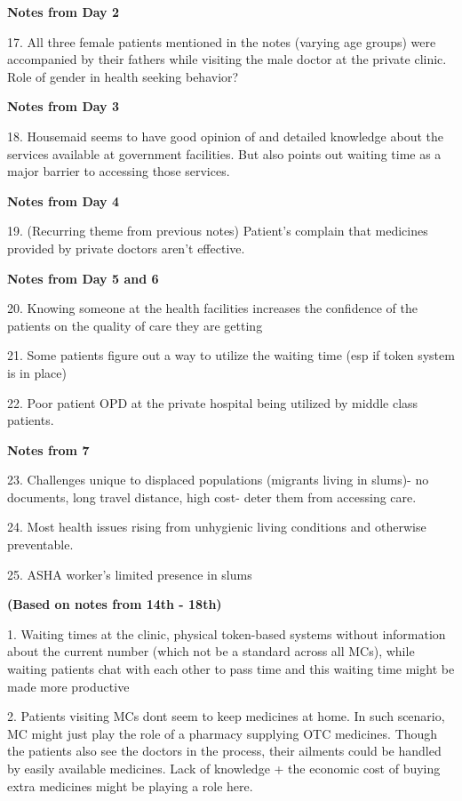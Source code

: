 \textbf{Notes from Day 2}

17. All three female patients mentioned in the notes (varying age groups) were accompanied by their fathers while visiting the male doctor at the private clinic. Role of gender in health seeking behavior?

\textbf{Notes from Day 3}

18. Housemaid seems to have good opinion of and detailed knowledge about the services available at government facilities. But also points out waiting time as a major barrier to accessing those services.

\textbf{Notes from Day 4}

19. (Recurring theme from previous notes) Patient's complain that medicines provided by private doctors aren't effective. 

\textbf{Notes from Day 5 and 6}

20. Knowing someone at the health facilities increases the confidence of the patients on the quality of care they are getting

21. Some patients figure out a way to utilize the waiting time (esp if token system is in place)

22. Poor patient OPD at the private hospital being utilized by middle class patients. 

\textbf{Notes from 7}

23. Challenges unique to displaced populations (migrants living in slums)- no documents, long travel distance, high cost- deter them from accessing care. 

24. Most health issues rising from unhygienic living conditions and otherwise preventable.

25. ASHA worker's limited presence in slums

\textbf{(Based on notes from 14th - 18th)}

1. Waiting times at the clinic, physical token-based systems without information about the current number (which not be a standard across all MCs), while waiting patients chat with each other to pass time and this waiting time might be made more productive

2. Patients visiting MCs dont seem to keep medicines at home. In such scenario, MC might just play the role of a pharmacy supplying OTC medicines. Though the patients also see the doctors in the process, their ailments could be handled by easily available medicines. Lack of knowledge + the economic cost of buying extra medicines might be playing a role here.

